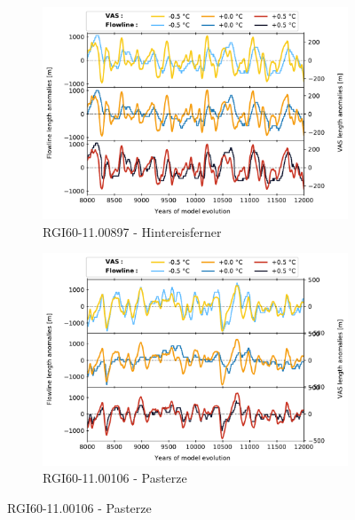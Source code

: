           \begin{figure}[htp]
            \centering
            \begin{subfigure}[b]{0.48\textwidth}
              \caption{RGI60-11.00897 - Hintereisferner}
              \label{fig:random_length:hintereisferner}
              \centering
              \includegraphics[width=\textwidth]{../plots/final_plots/random_length/Hintereisferner.pdf}
            \end{subfigure}
            \hfill
            \begin{subfigure}[b]{0.48\textwidth}
              \caption{RGI60-11.00106 - Pasterze}
              \label{fig:random_length:pasterze}
              \centering
              \includegraphics[width=\textwidth]{../plots/final_plots/random_length/Pasterze.pdf}
            \end{subfigure}

\end{figure}
